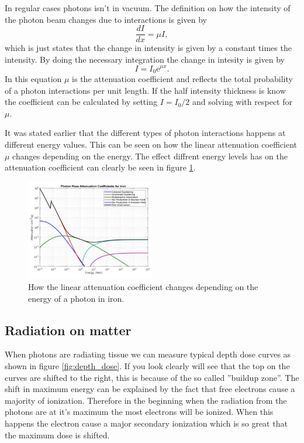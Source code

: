 \documentclass[jmp, amsmath, amssymb, reprint]{article}
\numberwithin{equation}{section}
\newcommand{\e}{\mathrm{e}}
\begin{document}
\begin{multicols}{2}
In regular cases photons isn't in vacuum. The definition on how the intensity of the photon beam changes due to interactions is given by
\begin{equation}
\frac{dI}{dx}=\mu I,
\end{equation}
which is just states that the change in intensity is given by a constant times the intensity. By doing the necessary integration the change in intesity is given by
\begin{equation}
I=I_0\e^{\mu x}.
\end{equation}
In this equation \(\mu\) is the attenuation coefficient and reflects the total probability of a photon interactions per unit length. If the half intensity thickness is know the coefficient can be calculated by setting \(I=I_0/2\) and solving with respect for \(\mu\).

It was stated earlier that the different types of photon interactions happens at different energy values. This can be seen on how the linear attenuation coefficient \(\mu\) changes depending on the energy. The effect diffrent energy levels has on the attenuation coefficient can clearly be seen in figure \ref{fig:lac}.

\begin{figure}[H]
	\centering
  	\includegraphics[width=0.50\textwidth]{lac.png}
	\caption{How the linear attenuation coefficient changes depending on the energy of a photon in iron.}
	\label{fig:lac}
\end{figure}

\subsection{Radiation on matter}

When photons are radiating tissue we can measure typical depth dose curves as shown in figure \ref{fig:depth_dose}. If you look clearly will see that the top on the curves are shifted to the right, this is because of the so called ''buildup zone''. The shift in maximum energy can be explained by the fact that free electrons cause a majority of ionization. Therefore in the beginning when the radiation from the photons are at it's maximum the most electrons will be ionized. When this happens the electron cause a major secondary ionization which is so great that the maximum dose is shifted.


\end{multicols}
\end{document}
